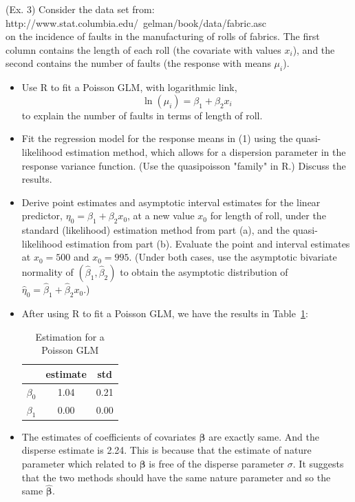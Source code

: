 \documentclass[]{article}
\begin{document}
\begin{enumerate}
{\item (Ex. 3)
Consider the data set from:\\
http://www.stat.columbia.edu/~gelman/book/data/fabric.asc\\
on the incidence of faults in the manufacturing of rolls of fabrics. The first column contains the length of each roll (the covariate with values $x_i$), and the second contains the number of faults (the response with means $\mu_i$).
\begin{itemize}
	\item[(a)] Use R to fit a Poisson GLM, with logarithmic link,
	\begin{equation}
	\ln(\mu_i) = \beta_1 + \beta_2x_i
	\end{equation}
	to explain the number of faults in terms of length of roll.
	\item[(b)] Fit the regression model for the response means in (1) using the quasi-likelihood estimation method, which allows for a dispersion parameter in the response variance function. (Use the quasipoisson "family" in R.) Discuss the results.
	\item[(c)] Derive point estimates and asymptotic interval estimates for the linear predictor, $\eta_0 = \beta_1 + \beta_2x_0$, at a new value $x_0$ for length of roll, under the standard (likelihood) estimation method from part (a), and the quasi-likelihood estimation from part (b). Evaluate the point and interval estimates at $x_0 = 500$ and $x_0=995$. (Under both cases, use the asymptotic bivariate normality of $(\hat{\beta}_1,\hat{\beta}_2)$ to obtain the asymptotic distribution of $\hat{\eta}_0 = \hat{\beta}_1 + \hat{\beta}_2x_0$.)
\end{itemize}
\item[(Sol. 3)]
\begin{itemize}
	\item[(a)] After using R to fit a Poisson GLM, we have the results in Table~\ref{est}:
	\begin{table}
		\centering
		\caption{Estimation for a Poisson GLM}
		\begin{tabular}{|c|c|c|}
			\hline
			& estimate & std \\
			\hline
			$\beta_0$ & 1.04 & 0.21 \\
			\hline
			$\beta_1$ & 0.00 & 0.00 \\
			\hline
		\end{tabular}
		\label{est}
	\end{table}
	\item[(b)] The estimates of coefficients of covariates $\bm{\beta}$ are exactly same. And the disperse estimate is 2.24. This is because that the estimate of nature parameter which related to $\bm{\beta}$ is free of the disperse parameter $\sigma$. It suggests that the two methods should have the same nature parameter and so the same $\hat{\bm{\beta}}$.

\end{itemize}}
\end{enumerate}
\end{document}
